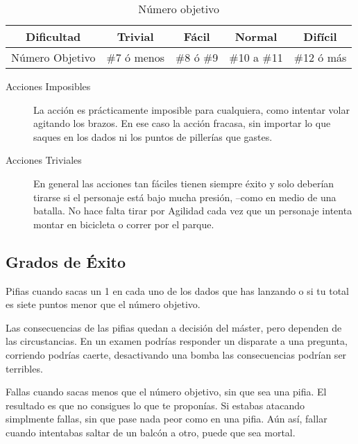 \begin{table}[h]
\centering
\begin{tabular}{ccccc}
\toprule
Dificultad&Trivial&Fácil&Normal&Difícil\\\midrule
Número Objetivo&\#7 ó menos&\#8 ó \#9&\#10 a \#11&\#12 ó más\\\midrule
\bottomrule
\end{tabular}
\caption{Número objetivo}
\end{table}


\begin{description}
\item[Acciones Imposibles] La acción es prácticamente imposible para cualquiera, como intentar volar agitando los brazos. En ese caso la acción fracasa, sin importar lo que saques en los dados ni los puntos de pillerías que gastes.
\item[Acciones Triviales] En general las acciones tan fáciles tienen siempre éxito y solo deberían tirarse si el personaje está bajo mucha presión, --como en medio de una batalla. No hace falta tirar por Agilidad cada vez que un personaje intenta montar en bicicleta o correr por el parque.
\end{description}

\subsection{Grados de Éxito}


Pifias cuando sacas un 1 en cada uno de los dados que has lanzando o si tu total es siete puntos menor que el número objetivo.

Las consecuencias de las pifias quedan a decisión del máster, pero dependen de las circustancias. En un examen podrías responder un disparate a una pregunta, corriendo podrías caerte, desactivando una bomba las consecuencias podrían ser terribles.


Fallas cuando sacas menos que el número objetivo, sin que sea una pifia. El resultado es que no consigues lo que te proponías. Si estabas atacando simplmente fallas, sin que pase nada peor como en una pifia. Aún así, fallar cuando intentabas saltar de un balcón a otro, puede que sea mortal.


